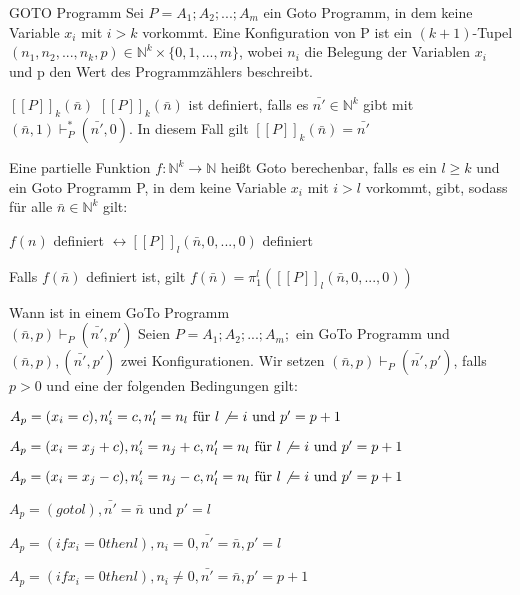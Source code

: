 \documentclass[avery5371, frame]{flashcards}
\begin{document}
\begin{flashcard}[Definition]{GOTO Programm}
    Sei $P=A_1;A_2;...;A_m$ ein Goto Programm, in dem keine Variable $x_i$ mit $i>k$ vorkommt. Eine Konfiguration von P ist ein $(k+1)$-Tupel $(n_1,n_2,...,n_k,p)\in\mathbb{N}^k\times\{0,1,...,m\}$, wobei $n_i$ die Belegung der Variablen $x_i$ und p den Wert des Programmzählers beschreibt.
\end{flashcard}

\begin{flashcard}[Definition]{$[[P]]_k(\bar{n})$}
    $[[P]]_k(\bar{n})$ ist definiert, falls es $\bar{n'}\in\mathbb{N}^k$ gibt mit $(\bar{n},1)\vdash_P^* (\bar{n'},0)$. In diesem Fall gilt $[[P]]_k(\bar{n})=\bar{n'}$
\end{flashcard}

\begin{flashcard}[Definition]{ Eine partielle Funktion $f:\mathbb{N}^k\rightarrow\mathbb{N}$ heißt Goto berechenbar,}
    falls es ein $l\geq k$ und ein Goto Programm P, in dem keine Variable $x_i$ mit $i>l$ vorkommt, gibt, sodass für alle $\bar{n}\in\mathbb{N}^k$ gilt:\begin{itemize*}
        \item $f(n)$ definiert $\leftrightarrow [[P]]_l(\bar{n},0,...,0)$ definiert
        \item Falls $f(\bar{n})$ definiert ist, gilt $f(\bar{n})=\pi_1^l ([[P]]_l(\bar{n},0,...,0))$
    \end{itemize*}
\end{flashcard}

\begin{flashcard}[Definition]{Wann ist in einem GoTo Programm\\ $(\bar{n},p)\vdash_P (\bar{n'},p')$}
    Seien $P=A_1;A_2;...;A_m;$ ein GoTo Programm und $(\bar{n},p), (\bar{n'},p')$ zwei Konfigurationen. Wir setzen $(\bar{n},p)\vdash_P (\bar{n'},p')$, falls $p>0$ und eine der folgenden Bedingungen gilt:
    \scriptsize{
        \begin{itemize*}
            \item $A_p=(x_i=c), n'_i=c, n'_l=n_l \text{ für } l\not\ =i \text { und } p'=p+1$
            \item $A_p=(x_i=x_j+c), n'_i=n_j+c, n'_l=n_l \text{ für } l\not\ =i \text{ und } p'=p+1$
            \item $A_p=(x_i=x_j-c), n'_i=n_j-c, n'_l=n_l \text{ für } l\not\ =i \text{ und } p'=p+1$
            \item $A_p=(goto l), \bar{n'}=\bar{n} \text{ und } p'=l$
            \item $A_p=(if x_i=0 then l), n_i=0, \bar{n'}=\bar{n}, p'=l$
            \item $A_p=(if x_i=0 then l), n_i\not=0, \bar{n'}=\bar{n}, p'=p+1$
        \end{itemize*}
    }
\end{flashcard}
\end{document}
